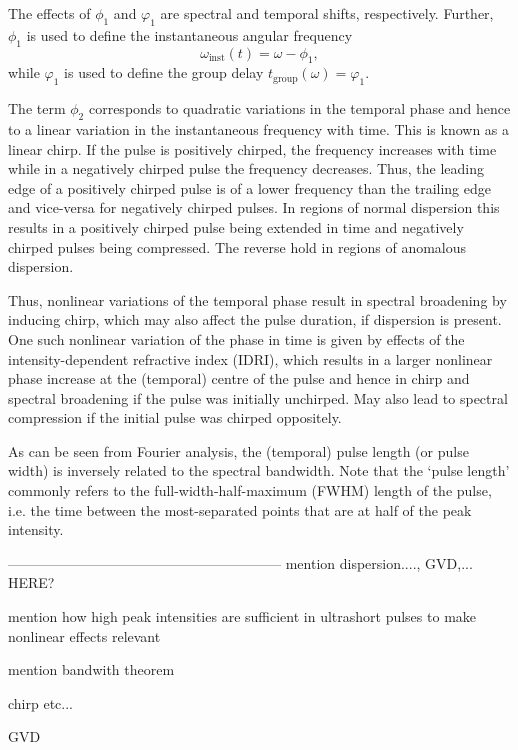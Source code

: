 \documentclass[a4paper]{jpconf}
\begin{document}
The effects of $\phi_1$ and $\varphi_1$ are spectral and temporal shifts, respectively. Further, $\phi_1$ is used to define the instantaneous angular frequency 
\begin{equation}
\omega_\text{inst}(t) = \omega - \phi_1,
\end{equation}  
while $\varphi_1$ is used to define the group delay $t_\text{group}(\omega) = \varphi_1$. \par 
The term $\phi_2$ corresponds to quadratic variations in the temporal phase and hence to a linear variation in the instantaneous frequency with time. This is known as a linear chirp. If the pulse is positively chirped, the frequency increases with time while in a negatively chirped pulse the frequency decreases. Thus, the leading edge of a positively chirped pulse is of a lower frequency than the trailing edge and vice-versa for negatively chirped pulses.  In regions of normal dispersion this results in a positively chirped pulse being extended in time and negatively chirped pulses being compressed. The reverse hold in regions of anomalous dispersion. \par 
Thus, nonlinear variations of the temporal phase result in spectral broadening by inducing chirp, which may also affect the pulse duration, if dispersion is present. One such nonlinear variation of the phase in time is given by effects of the intensity-dependent refractive index (IDRI), which results in a larger nonlinear phase increase at the (temporal) centre of the pulse and hence in chirp and spectral broadening if the pulse was initially unchirped. May also lead to spectral compression if the initial pulse was chirped oppositely.  \par 
As can be seen from Fourier analysis, the (temporal) pulse length (or pulse width) is inversely related to the spectral bandwidth. Note that the `pulse length' commonly refers to the full-width-half-maximum (FWHM) length of the pulse, i.e. the time between the most-separated points that are at half of the peak intensity. 



-----------------------------------------------------------
mention dispersion...., GVD,... HERE?

mention how high peak intensities are sufficient in ultrashort pulses to make nonlinear effects relevant 

mention bandwith theorem

chirp etc...

GVD
\end{document}
